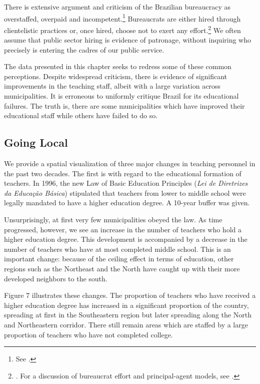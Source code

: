 \documentclass[12pt,]{book}
\let\rmarkdownfootnote\footnote%
\def\footnote{\protect\rmarkdownfootnote}
\begin{document}
There is extensive argument and criticism of the Brazilian bureaucracy as overstaffed, overpaid and incompetent.\footnote{See \citet{cardoso_jr_burocracia_2011}.} Bureaucrats are either hired through clientelistic practices or, once hired, choose not to exert any effort.\footnote{\citet{calvo_who_2004}. For a discussion of bureaucrat effort and principal-agent models, see \citet{gailmard_formal_2012}.} We often assume that public sector hiring is evidence of patronage, without inquiring who precisely is entering the cadres of our public service.

The data presented in this chapter seeks to redress some of these common perceptions. Despite widespread criticism, there is evidence of significant improvements in the teaching staff, albeit with a large variation across municipalities. It is erroneous to uniformly critique Brazil for its educational failures. The truth is, there are some municipalities which have improved their educational staff while others have failed to do so.

\subsection{Going Local}

We provide a spatial visualization of three major changes in teaching personnel in the past two decades. The first is with regard to the educational formation of teachers. In 1996, the new Law of Basic Education Principles (\emph{Lei de Diretrizes da Educação Básica}) stipulated that teachers from lower to middle school were legally mandated to have a higher education degree. A 10-year buffer was given.

Unsurprisingly, at first very few municipalities obeyed the law. As time progressed, however, we see an increase in the number of teachers who hold a higher education degree. This development is accompanied by a decrease in the number of teachers who have at most completed middle school. This is an important change: because of the ceiling effect in terms of education, other regions such as the Northeast and the North have caught up with their more developed neighbors to the south.

Figure 7 illustrates these changes. The proportion of teachers who have received a higher education degree has increased in a significant proportion of the country, spreading at first in the Southeastern region but later spreading along the North and Northeastern corridor. There still remain areas which are staffed by a large proportion of teachers who have not completed college.
\end{document}
